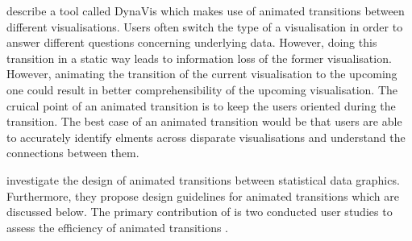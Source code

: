 \cbstart
\citeauthor{Heer2007} describe a tool called DynaVis which makes use of animated transitions between different visualisations. Users often switch the type of a visualisation in order to answer different questions concerning underlying data. However, doing this transition in a static way leads to information loss of the former visualisation. However, animating the transition of the current visualisation to the upcoming one could result in better comprehensibility of the upcoming visualisation. The cruical point of an animated transition is to keep the users oriented during the transition. The best case of an animated transition would be that users are able to accurately identify elments across disparate visualisations and understand the connections between them.

\citeauthor{Heer2007} investigate the design of animated transitions between statistical data graphics. Furthermore, they propose design guidelines for animated transitions which are discussed below. The primary contribution of \citeauthor{Heer2007} is two conducted user studies to assess the efficiency of animated transitions .

